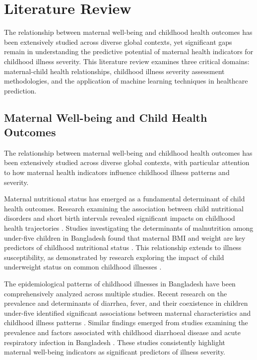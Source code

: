 \documentclass[12pt]{report}
\begin{document}
\chapter{Literature Review}

The relationship between maternal well-being and childhood health outcomes has been extensively studied across diverse global contexts, yet significant gaps remain in understanding the predictive potential of maternal health indicators for childhood illness severity. This literature review examines three critical domains: maternal-child health relationships, childhood illness severity assessment methodologies, and the application of machine learning techniques in healthcare prediction.

\section{Maternal Well-being and Child Health Outcomes}

The relationship between maternal well-being and childhood health outcomes has been extensively studied across diverse global contexts, with particular attention to how maternal health indicators influence childhood illness patterns and severity.

Maternal nutritional status has emerged as a fundamental determinant of child health outcomes. Research examining the association between child nutritional disorders and short birth intervals revealed significant impacts on childhood health trajectories \cite{ref6}. Studies investigating the determinants of malnutrition among under-five children in Bangladesh found that maternal BMI and weight are key predictors of childhood nutritional status \cite{ref10}. This relationship extends to illness susceptibility, as demonstrated by research exploring the impact of child underweight status on common childhood illnesses \cite{ref11}.

The epidemiological patterns of childhood illnesses in Bangladesh have been comprehensively analyzed across multiple studies. Recent research on the prevalence and determinants of diarrhea, fever, and their coexistence in children under-five identified significant associations between maternal characteristics and childhood illness patterns \cite{ref7}. Similar findings emerged from studies examining the prevalence and factors associated with childhood diarrhoeal disease and acute respiratory infection in Bangladesh \cite{ref8}. These studies consistently highlight maternal well-being indicators as significant predictors of illness severity.
\end{document}
